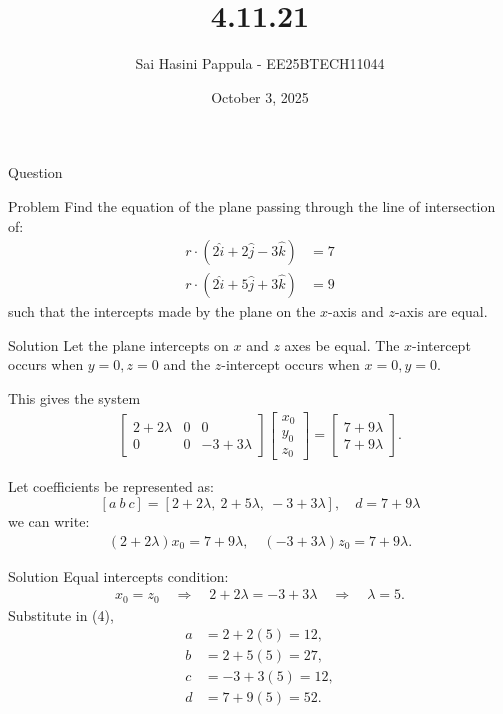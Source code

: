\documentclass{beamer}
\title %
{4.11.21}
\date{October 3, 2025}
\author %
{Sai Hasini Pappula - EE25BTECH11044}
\begin{document}
\begin{frame}
\titlepage
\end{frame}

\begin{frame}{Question}
\begin{block}{Problem}
Find the equation of the plane passing through the line of intersection of:
\begin{align}
r \cdot (2\hat{i} + 2\hat{j} - 3\hat{k}) &= 7\\
r \cdot (2\hat{i} + 5\hat{j} + 3\hat{k}) &= 9 
\end{align}
such that the intercepts made by the plane on the $x$-axis and $z$-axis are equal.  
\end{block}
\end{frame}

\begin{frame}{Solution}
Let the plane intercepts on $x$ and $z$ axes be equal.  
The $x$-intercept occurs when $y=0, z=0$ and the $z$-intercept occurs when $x=0, y=0$.  

This gives the system
\begin{align}
\begin{bmatrix}
2 + 2\lambda & 0 & 0 \\
0 & 0 & -3 + 3\lambda
\end{bmatrix}
\begin{bmatrix} x_0 \\ y_0 \\ z_0 \end{bmatrix} =
\begin{bmatrix} 7 + 9\lambda \\ 7 + 9\lambda \end{bmatrix}. 
\end{align}

Let coefficients be represented as:
\[
[a\ b\ c] = [2 + 2\lambda,\ 2 + 5\lambda,\ -3 + 3\lambda], \quad d = 7 + 9\lambda
\]
we can write:
\begin{align}
(2 + 2\lambda)x_0 = 7 + 9\lambda, \quad (-3 + 3\lambda) z_0 = 7 + 9\lambda. 
\end{align}
\end{frame}

\begin{frame}{Solution}
Equal intercepts condition:
\begin{align}
x_0 = z_0 \quad \Rightarrow \quad 2 + 2\lambda = -3 + 3\lambda \quad \Rightarrow \quad \lambda = 5. 
\end{align}
Substitute in (4),
\begin{align}
a &= 2 + 2(5) = 12, \nonumber\\
b &= 2 + 5(5) = 27, \nonumber\\
c &= -3 + 3(5) = 12, \nonumber\\
d &= 7 + 9(5) = 52. 
\end{align}

\end{frame}
\end{document}
